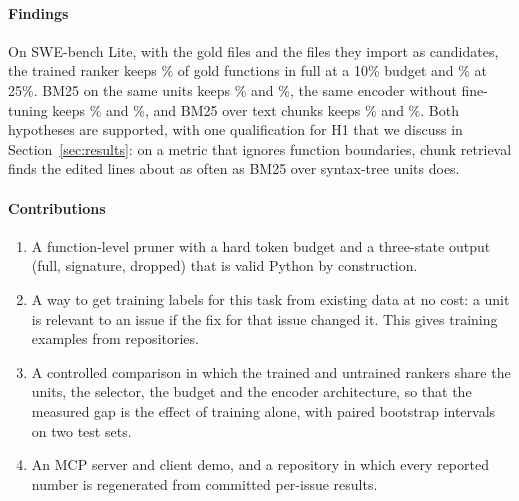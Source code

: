 \paragraph{Findings} On SWE-bench Lite, with the gold files and the files they import as candidates, the trained ranker keeps \% of gold functions in full at a 10\% budget and \% at 25\%. BM25 on the same units keeps \% and \%, the same encoder without fine-tuning keeps \% and \%, and BM25 over text chunks keeps \% and \%. Both hypotheses are supported, with one qualification for H1 that we discuss in Section~\ref{sec:results}: on a metric that ignores function boundaries, chunk retrieval finds the edited lines about as often as BM25 over syntax-tree units does.

\paragraph{Contributions}
\begin{enumerate}
\item A function-level pruner with a hard token budget and a three-state output (full, signature, dropped) that is valid Python by construction.
\item A way to get training labels for this task from existing data at no cost: a unit is relevant to an issue if the fix for that issue changed it. This gives  training examples from  repositories.
\item A controlled comparison in which the trained and untrained rankers share the units, the selector, the budget and the encoder architecture, so that the measured gap is the effect of training alone, with paired bootstrap intervals on two test sets.
\item An MCP server and client demo, and a repository in which every reported number is regenerated from committed per-issue results.
\end{enumerate}

